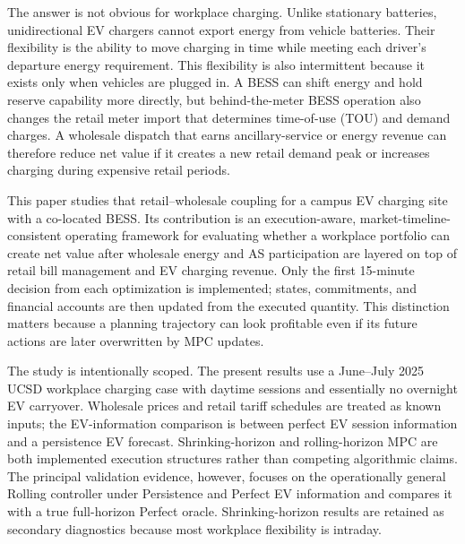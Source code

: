 \documentclass[final,5p,times]{elsarticle}
\begin{document}
The answer is not obvious for workplace charging. Unlike stationary batteries, unidirectional EV chargers cannot export energy from vehicle batteries. Their flexibility is the ability to move charging in time while meeting each driver's departure energy requirement. This flexibility is also intermittent because it exists only when vehicles are plugged in. A BESS can shift energy and hold reserve capability more directly, but behind-the-meter BESS operation also changes the retail meter import that determines time-of-use (TOU) and demand charges. A wholesale dispatch that earns ancillary-service or energy revenue can therefore reduce net value if it creates a new retail demand peak or increases charging during expensive retail periods.

This paper studies that retail--wholesale coupling for a campus EV charging site with a co-located BESS. Its contribution is an execution-aware, market-timeline-consistent operating framework for evaluating whether a workplace portfolio can create net value after wholesale energy and AS participation are layered on top of retail bill management and EV charging revenue. Only the first 15-minute decision from each optimization is implemented; states, commitments, and financial accounts are then updated from the executed quantity. This distinction matters because a planning trajectory can look profitable even if its future actions are later overwritten by MPC updates.

The study is intentionally scoped. The present results use a June--July 2025 UCSD workplace charging case with daytime sessions and essentially no overnight EV carryover. Wholesale prices and retail tariff schedules are treated as known inputs; the EV-information comparison is between perfect EV session information and a persistence EV forecast. Shrinking-horizon and rolling-horizon MPC are both implemented execution structures rather than competing algorithmic claims. The principal validation evidence, however, focuses on the operationally general Rolling controller under Persistence and Perfect EV information and compares it with a true full-horizon Perfect oracle. Shrinking-horizon results are retained as secondary diagnostics because most workplace flexibility is intraday.
\end{document}
